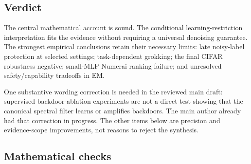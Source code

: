 \documentclass[
  british,
  10pt,
  a4paper,
]{article}
\begin{document}
\subsection{Verdict}\label{final-synthesis-audit--verdict}

The central mathematical account is sound. The conditional
learning-\allowbreak{}restriction interpretation fits the evidence
without requiring a universal denoising guarantee. The strongest
empirical conclusions retain their necessary limits: late
noisy-\allowbreak{}label protection at selected settings;
task-\allowbreak{}dependent grokking; the final CIFAR robustness
negative; small-MLP Numerai ranking failure; and unresolved
safety/\allowbreak{}capability tradeoffs in EM.

One substantive wording correction is needed in the reviewed main draft:
supervised backdoor-\allowbreak{}ablation experiments are not a direct
test showing that the canonical spectral filter learns or amplifies
backdoors. The main author already had that correction in progress. The
other items below are precision and evidence-\allowbreak{}scope
improvements\allowbreak{},\allowbreak{} not reasons to reject the
synthesis.

\subsection{Mathematical
checks}\label{final-synthesis-audit--mathematical-checks}
\end{document}
